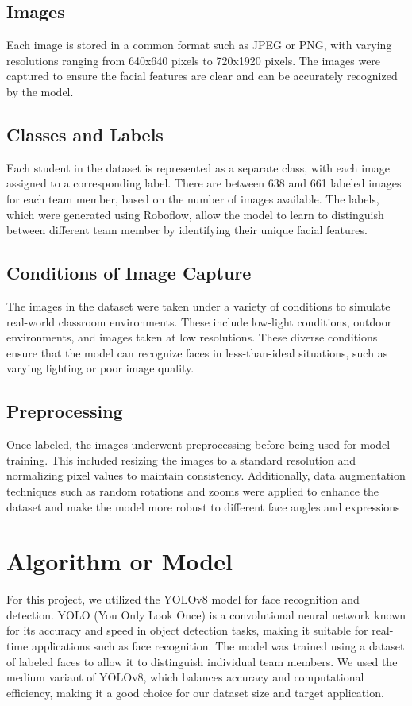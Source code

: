 \subsection{Images}
Each image is stored in a common format such as JPEG or PNG, with varying resolutions ranging from 640x640 pixels to 720x1920 pixels. The images were captured to ensure the facial features are clear and can be accurately recognized by the model.
\subsection{Classes and Labels}
Each student in the dataset is represented as a separate class, with each image assigned to a corresponding label. There are between 638 and 661 labeled images for each team member, based on the number of images available. The labels, which were generated using Roboflow, allow the model to learn to distinguish between different team member by identifying their unique facial features.
\subsection{Conditions of Image Capture}
The images in the dataset were taken under a variety of conditions to simulate real-world classroom environments. These include low-light conditions, outdoor environments, and images taken at low resolutions. These diverse conditions ensure that the model can recognize faces in less-than-ideal situations, such as varying lighting or poor image quality.
\subsection{Preprocessing}
Once labeled, the images underwent preprocessing before being used for model training. This included resizing the images to a standard resolution and normalizing pixel values to maintain consistency. Additionally, data augmentation techniques such as random rotations and zooms were applied to enhance the dataset and make the model more robust to different face angles and expressions

\section{Algorithm or Model}
For this project, we utilized the YOLOv8 model for face recognition and detection. YOLO (You Only Look Once) is a convolutional neural network known for its accuracy and speed in object detection tasks, making it suitable for real-time applications such as face recognition. The model was trained using a dataset of labeled faces to allow it to distinguish individual team members. We used the medium variant of YOLOv8, which balances accuracy and computational efficiency, making it a good choice for our dataset size and target application.

